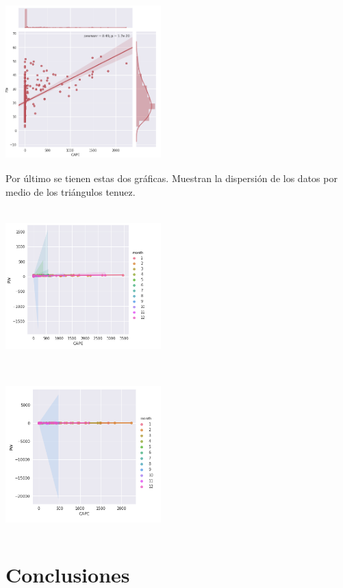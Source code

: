 \documentclass{article}
\begin{document}
\begin{center}
  \includegraphics[width=6cm, height=6cm]{dispersosGraficaZ.png}
\end{center}

Por último se tienen estas dos gráficas. Muestran la dispersión de los datos por medio de los triángulos tenuez.

\begin{center}
  \includegraphics[width=6cm, height=6cm]{JuntosGraf.png}
\end{center}

\begin{center}
  \includegraphics[width=6cm, height=6cm]{juntosGraficaZ.png}
\end{center}


\section{Conclusiones}
\end{document}
